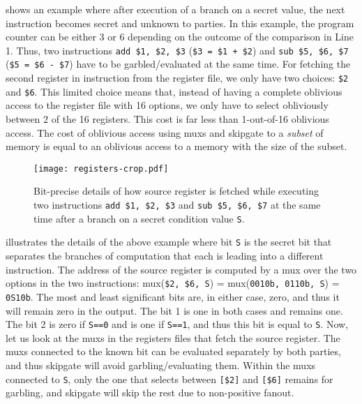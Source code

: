  shows an example where after execution of a branch on a secret value, the next instruction becomes secret and unknown to parties.
In this example, the program counter can be either 3 or 6 depending on the outcome of the comparison in Line 1.
Thus, two instructions \texttt{add \$1, \$2, \$3} (\texttt{\$3 = \$1 + \$2}) and \texttt{sub \$5, \$6, \$7} (\texttt{\$5 = \$6 - \$7}) have to be garbled/evaluated at the same time.
For fetching the second register in instruction from the register file, we only have two choices: \texttt{\$2} and \texttt{\$6}.
This limited choice means that, instead of having a complete oblivious access to the register file with 16 options, we only have to select obliviously between 2 of the 16 registers.
This cost is far less than 1-out-of-16 oblivious access.
The cost of oblivious access using \acrshort{mux}s and \gls{skipgate} to a \textit{subset} of memory is equal to an oblivious access to a memory with the size of the subset.

\begin{figure}
\centering
\texttt{[image: registers-crop.pdf]}
\caption{Bit-precise details of how source register is fetched while executing two instructions \texttt{add \$1, \$2, \$3} and \texttt{sub \$5, \$6, \$7} at the same time after a branch on a secret condition value \texttt{S}.}
\label{fig:registers}
\end{figure}

 illustrates the details of the above example where bit \texttt{S} is the secret bit that separates the branches of computation that each is leading into a different instruction.
The address of the source register is computed by a \acrshort{mux} over the two options in the two instructions: \acrshort{mux}(\texttt{\$2, \$6, S}) = \acrshort{mux}(\texttt{0010b, 0110b, S}) = \texttt{0S10b}.
The most and least significant bits are, in either case, zero, and thus it will remain zero in the output.
The bit 1 is one in both cases and remains one.
The bit 2 is zero if \texttt{S==0} and is one if \texttt{S==1}, and thus this bit is equal to \texttt{S}.
Now, let us look at the \acrshort{mux}s in the registers files that fetch the source register.
The \acrshort{mux}s connected to the known bit can be evaluated separately by both parties, and thus \gls{skipgate} will avoid garbling/evaluating them.
Within the \acrshort{mux}s connected to \texttt{S}, only the one that selects between \texttt{[\$2]} and \texttt{[\$6]} remains for garbling, and \gls{skipgate} will skip the rest due to non-positive fanout.


